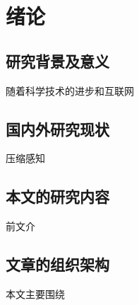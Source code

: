 
\chapter{绪论}\label{chapter1}
\vbox{}\vbox{}
\section{研究背景及意义}\label{section11}
\vbox{}
随着科学技术的进步和互联网


\vbox{}
\section{国内外研究现状}\label{section12}
\vbox{}

压缩感知


\vbox{}
\section{本文的研究内容}\label{section13}
\vbox{}

前文介


\vbox{}
\section{文章的组织架构}\label{section14}
\vbox{}
本文主要围绕





